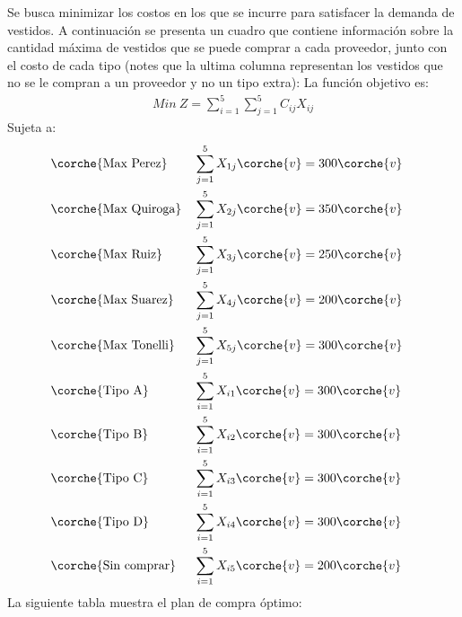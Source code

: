 \begin{homeworkProblem}[-1][Vestidos]
Se busca minimizar los costos en los que se incurre para satisfacer la demanda de vestidos. A continuación se presenta un cuadro que contiene información sobre la cantidad máxima de vestidos que se puede comprar a cada proveedor, junto con el costo de cada tipo (notes que la ultima columna representan los vestidos que no se le compran a un proveedor y no un tipo extra):
La función objetivo es:
\begin{align*}
    Min\ Z = \sum_{i=1}^{5}{\sum_{j=1}^{5}{C_{ij}X_{ij}}}
\end{align*}
Sujeta a:
\begin{align*}
    &\corche{\text{Max Perez}}& &\sum_{j=1}^{5}{X_{1j}}\corche{v} = 300\corche{v}& \\
    &\corche{\text{Max Quiroga}}& &\sum_{j=1}^{5}{X_{2j}}\corche{v} = 350\corche{v}& \\
    &\corche{\text{Max Ruiz}}& &\sum_{j=1}^{5}{X_{3j}}\corche{v} = 250\corche{v}& \\
    &\corche{\text{Max Suarez}}& &\sum_{j=1}^{5}{X_{4j}}\corche{v} = 200\corche{v}& \\
    &\corche{\text{Max Tonelli}}& &\sum_{j=1}^{5}{X_{5j}}\corche{v} = 300\corche{v}& \\
    &\corche{\text{Tipo A}}& &\sum_{i=1}^{5}{X_{i1}}\corche{v} = 300\corche{v}& \\
    &\corche{\text{Tipo B}}& &\sum_{i=1}^{5}{X_{i2}}\corche{v} = 300\corche{v}& \\
    &\corche{\text{Tipo C}}& &\sum_{i=1}^{5}{X_{i3}}\corche{v} = 300\corche{v}& \\
    &\corche{\text{Tipo D}}& &\sum_{i=1}^{5}{X_{i4}}\corche{v} = 300\corche{v}& \\
    &\corche{\text{Sin comprar}}& &\sum_{i=1}^{5}{X_{i5}}\corche{v} = 200\corche{v}& \\
\end{align*}
La siguiente tabla muestra el plan de compra óptimo:
\end{homeworkProblem}


